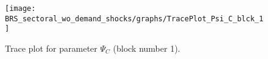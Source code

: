 \begin{figure}[H]
\centering
  \texttt{[image: BRS\_sectoral\_wo\_demand\_shocks/graphs/TracePlot\_Psi\_C\_blck\_1]}\\
    \caption{Trace plot for parameter ${\Psi_{C}}$ (block number 1).}
\end{figure}
